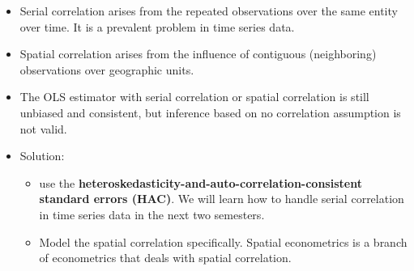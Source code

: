\documentclass[a4paper,11pt]{article}
\begin{document}
\begin{itemize}
\item Serial correlation arises from the repeated observations over the
same entity over time. It is a prevalent problem in time series
data.
\item Spatial correlation arises from the influence of contiguous
(neighboring) observations over geographic units.
\item The OLS estimator with serial correlation or spatial correlation is
still unbiased and consistent, but inference based on no correlation
assumption is not valid.
\item Solution: 
\begin{itemize}
\item use the \textbf{heteroskedasticity-and-auto-correlation-consistent
standard errors (HAC)}. We will learn how to handle serial
correlation in time series data in the next two semesters.
\item Model the spatial correlation specifically. Spatial econometrics
is a branch of econometrics that deals with spatial correlation.
\end{itemize}
\end{itemize}
\end{document}
